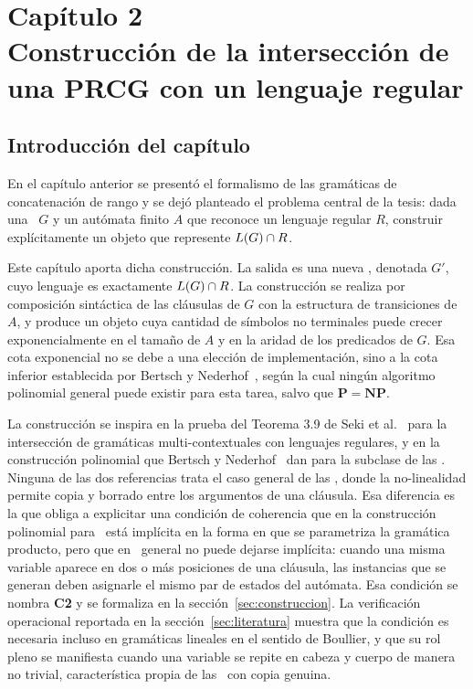 

\section*{Capítulo 2 \\[0.3em] Construcción de la intersección de una PRCG con un lenguaje regular}
\setcounter{section}{2}
\setcounter{subsection}{0}

\subsection{Introducción del capítulo}

En el capítulo anterior se presentó el formalismo de las gramáticas de concatenación de rango y se dejó planteado el problema central de la tesis: dada una \PRCG\ $G$ y un autómata finito $A$ que reconoce un lenguaje regular $R$, construir explícitamente un objeto que represente $L(G) \cap R$.

Este capítulo aporta dicha construcción. La salida es una nueva \PRCG, denotada $G'$, cuyo lenguaje es exactamente $L(G) \cap R$. La construcción se realiza por composición sintáctica de las cláusulas de $G$ con la estructura de transiciones de $A$, y produce un objeto cuya cantidad de símbolos no terminales puede crecer exponencialmente en el tamaño de $A$ y en la aridad de los predicados de $G$. Esa cota exponencial no se debe a una elección de implementación, sino a la cota inferior establecida por Bertsch y Nederhof~\cite{REF}, según la cual ningún algoritmo polinomial general puede existir para esta tarea, salvo que $\mathbf{P} = \mathbf{NP}$.

La construcción se inspira en la prueba del Teorema 3.9 de Seki et al.~\cite{REF} para la intersección de gramáticas multi-contextuales con lenguajes regulares, y en la construcción polinomial que Bertsch y Nederhof~\cite{REF} dan para la subclase de las \sRCG. Ninguna de las dos referencias trata el caso general de las \PRCG, donde la no-linealidad permite copia y borrado entre los argumentos de una cláusula. Esa diferencia es la que obliga a explicitar una condición de coherencia que en la construcción polinomial para \sRCG\ está implícita en la forma en que se parametriza la gramática producto, pero que en \PRCG\ general no puede dejarse implícita: cuando una misma variable aparece en dos o más posiciones de una cláusula, las instancias que se generan deben asignarle el mismo par de estados del autómata. Esa condición se nombra \textbf{C2} y se formaliza en la sección~\ref{sec:construccion}. La verificación operacional reportada en la sección~\ref{sec:literatura} muestra que la condición es necesaria incluso en gramáticas lineales en el sentido de Boullier, y que su rol pleno se manifiesta cuando una variable se repite en cabeza y cuerpo de manera no trivial, característica propia de las \PRCG\ con copia genuina.

